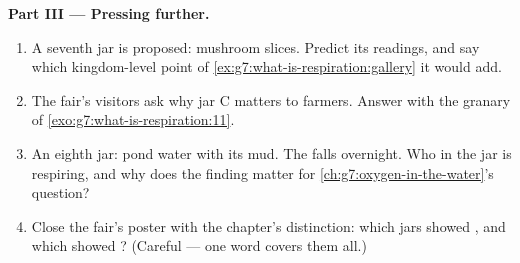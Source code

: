 \begin{problem}
\medskip\noindent\textbf{Part III --- Pressing further.}
\begin{enumerate}[resume]
  \item A seventh jar is proposed: mushroom slices. Predict
        its readings, and say which kingdom-level point of
        \cref{ex:g7:what-is-respiration:gallery} it would
        add.
  \item The fair's visitors ask why jar C matters to
        farmers. Answer with the granary of
        \cref{exo:g7:what-is-respiration:11}.
  \item An eighth jar: pond water with its mud. The 
        falls overnight. Who in the jar is respiring, and
        why does the finding matter for
        \cref{ch:g7:oxygen-in-the-water}'s question?
  \item Close the fair's poster with the chapter's
        distinction: which jars showed \emph{},
        and which showed \emph{}? (Careful ---
        one word covers them all.)
\end{enumerate}
\end{problem}
